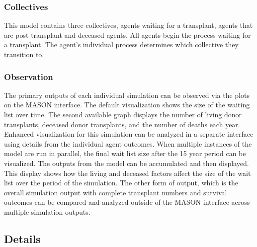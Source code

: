 \documentclass[9pt,a4paper,twocolumn]{scrartcl}
\begin{document}
\subsubsection{Collectives}
This model contains three collectives, agents waiting for a transplant, agents that are post-transplant and deceased agents.  All agents begin the process waiting for a transplant.  The agent’s individual process determines which collective they transition to.  

\subsubsection{Observation}
The primary outputs of each individual simulation can be observed via the plots on the MASON interface.  The default visualization shows the size of the waiting list over time.  The second available graph displays the number of living donor transplants, deceased donor transplants, and the number of deaths each year.  Enhanced visualization for this simulation can be analyzed in a separate interface using details from the individual agent outcomes.
When multiple instances of the model are run in parallel, the final wait list size after the 15 year period can be visualized.  The outputs from the model can be accumulated and then displayed.  This display shows how the living and deceased factors affect the size of the wait list over the period of the simulation.
The other form of output, which is the overall simulation output with complete transplant numbers and survival outcomes can be compared and analyzed outside of the MASON interface across multiple simulation outputs.

\subsection{Details}
\end{document}
